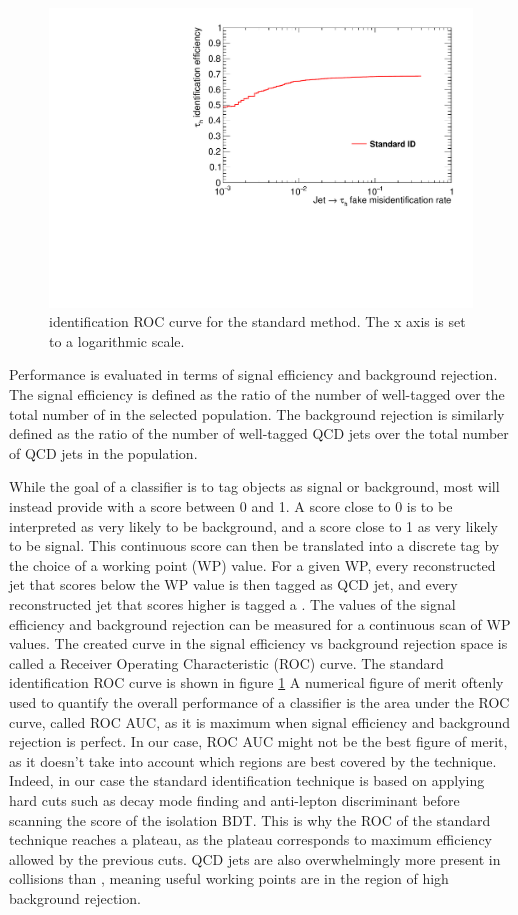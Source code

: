 \begin{figure}
    \centering
    \includegraphics[width=\textwidth]{Images/ROC_comp_std.pdf}
    \caption{\tauh identification ROC curve for the standard method. The x axis is set to a logarithmic scale.}
    \label{fig:std_ROC}
\end{figure}

Performance is evaluated in terms of signal efficiency and background rejection. The signal efficiency is defined as the ratio of the number of well-tagged \tauh over the total number of \tauh in the selected population. The background rejection is similarly defined as the ratio of the number of well-tagged QCD jets over the total number of QCD jets in the population.

While the goal of a classifier is to tag objects as signal or background, most will instead provide with a score between 0 and 1. A score close to 0 is to be interpreted as very likely to be background, and a score close to 1 as very likely to be signal. This continuous score can then be translated into a discrete tag by the choice of a working point (WP) value. For a given WP, every reconstructed jet that scores below the WP value is then tagged as QCD jet, and every reconstructed jet that scores higher is tagged a \tauh. The values of the signal efficiency and background rejection can be measured for a continuous scan of WP values. The created curve in the signal efficiency vs background rejection space is called a Receiver Operating Characteristic (ROC) curve. The standard identification ROC curve is shown in figure \ref{fig:std_ROC}
A numerical figure of merit oftenly used to quantify the overall performance of a classifier is the area under the ROC curve, called ROC AUC, as it is maximum when signal efficiency and background rejection is perfect.
In our case, ROC AUC might not be the best figure of merit, as it doesn't take into account which regions are best covered by the technique. Indeed, in our case the standard identification technique is based on applying hard cuts such as decay mode finding and anti-lepton discriminant before scanning the score of the isolation BDT. This is why the ROC of the standard technique reaches a plateau, as the plateau corresponds to maximum efficiency allowed by the previous cuts.
QCD jets are also overwhelmingly more present in collisions than \tauh, meaning useful working points are in the region of high background rejection. 

